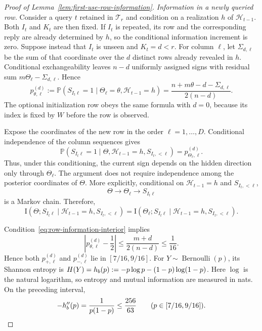 \documentclass[10pt,a4paper]{amsart}
\newcommand{\Prob}{\mathbb{P}}
\begin{document}
\begin{proof}[Proof of Lemma~\ref{lem:first-use-row-information}]
\emph{Information in a newly queried row.}
Consider a query $t$ retained in $\mathcal T_r$ and condition on a realization
$h$ of $\mathcal H_{t-1}$.  Both $I_t$ and $K_t$ are then fixed.  If $I_t$ is
repeated, its row and the corresponding reply are already determined by $h$,
so the conditional information increment is zero.  Suppose instead that
$I_t$ is unseen and $K_t=d<r$.  For column $\ell$, let $\Sigma_{d,\ell}$ be the
sum of that coordinate over the $d$ distinct rows already revealed in $h$.
Conditional exchangeability leaves $n-d$ uniformly assigned signs with
residual sum $m\Theta_\ell-\Sigma_{d,\ell}$.  Hence
\begin{equation}
 p_{\theta,\ell}^{(d)}
 :=
 \Prob(S_{I_t\ell}=1
 \mid \Theta_\ell=\theta,\mathcal H_{t-1}=h)
 =
 \frac{n+m\theta-d-\Sigma_{d,\ell}}{2(n-d)}.
 \label{eq:conditional-unseen-sign}
\end{equation}
The optional initialization row obeys the same formula with $d=0$, because its
index is fixed by $W$ before the row is observed.

Expose the coordinates of the new row in the order $\ell=1,\ldots,D$.
Conditional independence of the column sequences gives
\[
 \Prob(S_{I_t\ell}=1
 \mid\Theta,\mathcal H_{t-1}=h,S_{I_t,<\ell})
 =p_{\Theta_\ell,\ell}^{(d)}.
\]
Thus, under this conditioning, the current sign depends on the hidden
direction only through $\Theta_\ell$.  The argument does not require
independence among the posterior coordinates of $\Theta$.
More explicitly, conditional on $\mathcal H_{t-1}=h$ and
$S_{I_t,<\ell}$,
\[
 \Theta\longrightarrow\Theta_\ell\longrightarrow S_{I_t\ell}
\]
is a Markov chain.  Therefore,
\[
 \mathrm I(\Theta;S_{I_t\ell}
 \mid\mathcal H_{t-1}=h,S_{I_t,<\ell})
 =
 \mathrm I(\Theta_\ell;S_{I_t\ell}
 \mid\mathcal H_{t-1}=h,S_{I_t,<\ell}).
\]

Condition~\eqref{eq:row-information-interior} implies
\[
 \left|p_{\theta,\ell}^{(d)}-\frac12\right|
 \le
 \frac{m+d}{2(n-d)}
 \le\frac1{16}.
\]
Hence both $p_{+,\ell}^{(d)}$ and $p_{-,\ell}^{(d)}$ lie in
$[7/16,9/16]$.  For $Y\sim\operatorname{Bernoulli}(p)$, its Shannon entropy is
$H(Y)=h_{\rm b}(p):=-p\log p-(1-p)\log(1-p)$.  Here $\log$ is the natural
logarithm, so entropy and mutual information are measured in nats.  On the
preceding interval,
\[
 -h_{\rm b}''(p)=\frac1{p(1-p)}
 \le\frac{256}{63}
 \qquad (p\in[7/16,9/16]).
\]


\end{proof}
\end{document}
